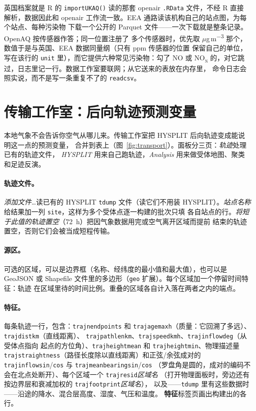 \documentclass[11pt]{ctexrep}
\newcommand{\codeunderscore}{\textunderscore\allowbreak}
\newcommand{\code}[1]{\texttt{\let\_\codeunderscore #1}}
\newcommand{\tab}[1]{\textbf{#1}}
\newcommand{\ugm}{\ensuremath{\mu}g\,m\textsuperscript{$-3$}}
\begin{document}
英国档案就是 R 的 \code{importUKAQ()} 读的那套 openair \code{.RData} 文件，不经 R 直接
解析，数据因此和 openair 工作流一致。EEA 通路读该机构自己的站点图，为每个站点、每种污染物
下载一个公开的 Parquet 文件——一次下载就是整条记录。OpenAQ 按传感器作答；同一位置注册了
多个传感器时，优先取 \ugm{} 那个，数值于是与英国、EEA 数据同量纲（只有 ppm 传感器的位置
保留自己的单位，写在该行的 \code{unit} 里），而它提供六种常见污染物：勾了 NO 或
NO\textsubscript{x} 的，对它跳过，日志里记一行。数据工作室要联网；从它送来的表放在内存里，
命令日志会照实说，而不是写一条重复不了的 \code{read\_csv}。


\section{传输工作室：后向轨迹预测变量}\label{sec:transport}
本地气象不会告诉你空气从哪儿来。传输工作室把 HYSPLIT 后向轨迹变成能说明这一点的预测变量，
合并到表上（图~\ref{fig:transport}）。面板分三页：\emph{轨迹}处理已有的轨迹文件，
\emph{HYSPLIT} 用来自己跑轨迹，\emph{Analysis} 用来做受体地图、聚类和足迹反演。

\paragraph{轨迹文件。}\emph{添加文件…}读已有的 HYSPLIT \code{tdump} 文件（读它们不用装
HYSPLIT）。\emph{站点名称}给结果加一列 \code{site}，这样为多个受体点逐一构建的批次只填
各自站点的行。\emph{将短于此值的轨迹置空}（72~h）把因气象数据用完或空气离开区域而提前
结束的轨迹置空，否则它们会被当成短程传输。

\paragraph{源区。}可选的区域，可以是边界框（名称、经纬度的最小值和最大值），也可以是
GeoJSON 或 Shapefile 文件里的多边形（\code{geo} 扩展）。每个区域加一个停留时间特征：轨迹
在区域里待的时间比例。重叠的区域各自计入落在两者之内的端点。

\paragraph{特征。}每条轨迹一行，包含：\code{traj\_n\_endpoints} 和
\code{traj\_age\_max\_h}（质量：它回溯了多远）、\code{traj\_dist\_km}（直线距离）、
\code{traj\_pathlen\_km}、\code{traj\_speed\_kmh}、\code{traj\_inflow\_deg}（从受体点指向
起点的方位角）、\code{traj\_height\_mean} 和 \code{traj\_height\_min}、物理描述量
\code{traj\_straightness}（路径长度除以直线距离）和正弦/余弦成对的
\code{traj\_inflow\_sin}/\code{\_cos} 与 \code{traj\_mean\_bearing\_sin}/\code{\_cos}
（罗盘角是圆的，成对的编码不会在北点处断开）、每个区域一个 \code{traj\_resid\_}\emph{区域名}
（打开物理面板时，旁边还有按边界层和衰减加权的 \code{traj\_footprint\_}\emph{区域名}），
以及——\code{tdump} 里有这些数据时——沿途的降水、混合层高度、湿度、气压和温度。
\tab{特征}标签页画出构建出的各行。
\end{document}
